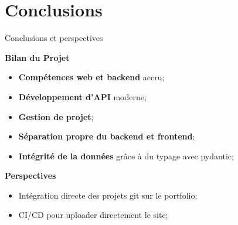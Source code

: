 \documentclass[10pt, aspectratio=169]{beamer}
\begin{document}
\section{Conclusions}
\begin{frame}{\large Conclusions et perspectives}
  \begin{block}{\textbf{Bilan du Projet}}
    \begin{itemize}
      \item \textbf{Compétences web et backend} accru;
      \item \textbf{Développement d'API} moderne;
      \item \textbf{Gestion de projet};
      \item \textbf{Séparation propre du backend et frontend};
      \item \textbf{Intégrité de la données} grâce à du typage avec pydantic;
    \end{itemize}
  \end{block}
  \vspace{0.1cm}
  \begin{alertblock}{\textbf{Perspectives}}
    \begin{itemize}
      \item Intégration directe des projets git sur le portfolio;
      \item CI/CD pour uploader directement le site;
    \end{itemize}
  \end{alertblock}
\end{frame}
\end{document}
